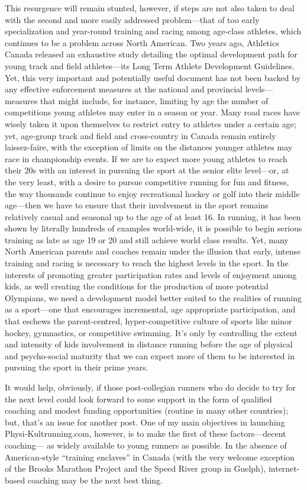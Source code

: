 This resurgence will remain stunted, however, if steps are not also taken to deal with the second and more easily addressed problem—that of too early specialization and year-round training and racing among age-class athletes, which continues to be a problem across North American. Two years ago, Athletics Canada released an exhaustive study detailing the optimal development path for young track and field athletes—its Long Term Athlete Development Guidelines. Yet, this very important and potentially useful document has not been backed by any effective enforcement measures at the national and provincial levels—measures that might include, for instance, limiting by age the number of competitions young athletes may enter in a season or year. Many road races have wisely taken it upon themselves to restrict entry to athletes under a certain age; yet, age-group track and field and cross-country in Canada remain entirely laissez-faire, with the exception of limits on the distances younger athletes may race in championship events. If we are to expect more young athletes to reach their 20s with an interest in pursuing the sport at the senior elite level—or, at the very least, with a desire to pursue competitive running for fun and fitness, the way thousands continue to enjoy recreational hockey or golf into their middle age—then we have to ensure that their involvement in the sport remains relatively casual and seasonal up to the age of at least 16. In running, it has been shown by literally hundreds of examples world-wide, it is possible to begin serious training as late as age 19 or 20 and still achieve world class results. Yet, many North American parents and coaches remain under the illusion that early, intense training and racing is necessary to reach the highest levels in the sport. In the interests of promoting greater participation rates and levels of enjoyment among kids, as well creating the conditions for the production of more potential Olympians, we need a development model better suited to the realities of running as a sport—one that encourages incremental, age appropriate participation, and that eschews the parent-centred, hyper-competitive culture of sports like minor hockey, gymnastics, or competitive swimming. It’s only by controlling the extent and intensity of kids involvement in distance running before the age of physical and psycho-social maturity that we can expect more of them to be interested in pursuing the sport in their prime years.

It would help, obviously, if those post-collegian runners who do decide to try for the next level could look forward to some support in the form of qualified coaching and modest funding opportunities (routine in many other countries); but, that’s an issue for another post. One of my main objectives in launching Physi-Kultrunning.com, however, is to make the first of these factors—decent coaching— as widely available to young runners as possible. In the absence of American-style “training enclaves” in Canada (with the very welcome exception of the Brooks Marathon Project and the Speed River group in Guelph), internet-based coaching may be the next best thing.

